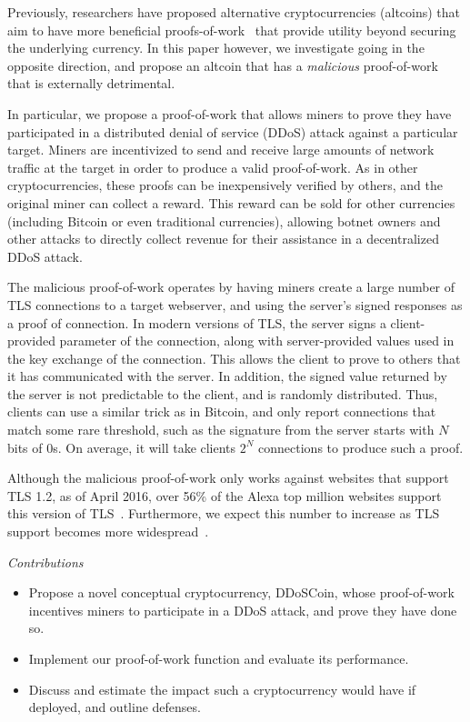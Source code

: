 Previously, researchers have proposed alternative cryptocurrencies (altcoins)
that aim to have more beneficial proofs-of-work~\cite{primecoin,permacoin} that
provide utility beyond securing the underlying currency. In this paper however,
we investigate going in the opposite direction, and propose an altcoin that has
a \emph{malicious} proof-of-work that is externally detrimental.

In particular, we propose a proof-of-work that allows miners to prove they have
participated in a distributed denial of service (DDoS) attack against a
particular target. Miners are incentivized to send and receive large amounts of network
traffic at the target in order to produce a valid proof-of-work. As in other
cryptocurrencies, these proofs can be inexpensively verified by others, and the
original miner can collect a reward. This reward can be sold for other
currencies (including Bitcoin or even traditional currencies), allowing botnet
owners and other attacks to directly collect revenue for their assistance
in a decentralized DDoS attack.


The malicious proof-of-work operates by having miners create a large number of
TLS connections to a target webserver, and using the server's signed responses
as a proof of connection. In modern versions of TLS, the server signs a
client-provided parameter of the connection, along with server-provided values
used in the key exchange of the connection. This allows the client to prove to
others that it has communicated with the server. In addition, the signed value
returned by the server is not predictable to the client, and is randomly
distributed. Thus, clients can use a similar trick as in Bitcoin, and only
report connections that match some rare threshold, such as the signature from
the server starts with $N$ bits of 0s. On average, it will take clients $2^{N}$
connections to produce such a proof.

Although the malicious proof-of-work only works against websites that support
TLS 1.2, as of April 2016, over 56\% of the Alexa top million websites support
this version of TLS~\cite{censys}. Furthermore, we expect this number to
increase as TLS support becomes more widespread~\cite{letsencrypt}.

\emph{Contributions}
\begin{itemize}
\item Propose a novel conceptual cryptocurrency, DDoSCoin, whose proof-of-work
incentives miners to participate in a DDoS attack, and prove they have done so.
\item Implement our proof-of-work function and evaluate its performance.
\item Discuss and estimate the impact such a cryptocurrency would have if
deployed, and outline defenses.
\end{itemize}

